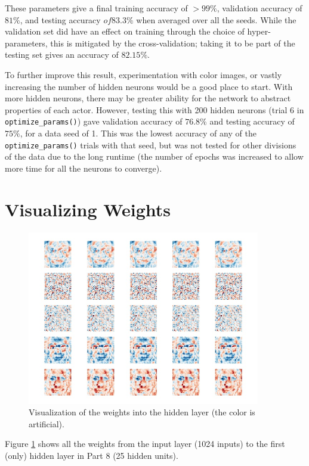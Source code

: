 \documentclass{article}
\begin{document}
   These parameters give a final training accuracy of $>99\%$, validation accuracy of $81\%$, and
   testing accuracy $of 83.3\%$ when averaged over all the seeds.
   While the validation set did have an effect on training through the choice of hyper-parameters,
   this is mitigated by the cross-validation; taking it to be part of the testing set gives an accuracy
   of $82.15\%$.

   To further improve this result, experimentation with color images, or vastly increasing the
   number of hidden neurons would be a good place to start. With more hidden neurons, there may be
   greater ability for the network to abstract properties of each actor. However, testing this
   with 200 hidden neurons (trial 6 in \texttt{optimize\_params()}) gave validation accuracy of
   $76.8\%$ and testing accuracy of $75\%$, for a data seed of 1. This was the lowest accuracy
   of any of the \texttt{optimize\_params()} trials with that seed, but was not tested for other
   divisions of the data due to the long runtime (the number of epochs was increased to allow more
   time for all the neurons to converge).


   \section{Visualizing Weights}
      \begin{figure}[h!] \centering
         \includegraphics[width=4in]{resources/part9}
         \caption{Visualization of the weights into the hidden layer (the color is artificial).}
         \label{part9}
       \end{figure}

   Figure \ref{part9} shows all the weights from the input layer (1024 inputs) to the first (only)
   hidden layer in Part 8 (25 hidden units).
\end{document}
